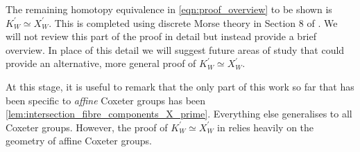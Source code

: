 \documentclass[class=article, crop=false]{standalone}
\begin{document}
The remaining homotopy equivalence in \eqref{eqn:proof_overview} to be shown is $K^\prime_W \simeq X^\prime_W$. This is completed using discrete Morse theory in Section 8 of \cite{paolini_salvetti_kpi1_2021}. We will not review this part of the proof in detail but instead provide a brief overview. In place of this detail we will suggest future areas of study that could provide an alternative, more general proof of $K^\prime_W \simeq X^\prime_W$.

At this stage, it is useful to remark that the only part of this work so far that has been specific to \emph{affine} Coxeter groups has been \cref{lem:intersection_fibre_components_X_prime}. Everything else generalises to all Coxeter groups. However, the proof of $K_W^\prime \simeq X^\prime_W$ in \cite{paolini_salvetti_kpi1_2021} relies heavily on the geometry of affine Coxeter groups.
\end{document}
